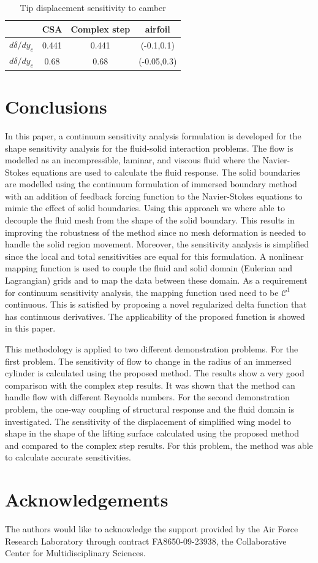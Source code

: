\documentclass[12pt]{aiaa-pretty}
\begin{document}
%
\begin{table}[H]
\centering
\begin{tabular}{c|c|c|c}
 & \multicolumn{1}{c|}{CSA} & \multicolumn{1}{c|}{Complex step} & airfoil \\ \hline
$d\delta/dy_c$ & 0.441 & 0.441 & (-0.1,0.1) \\ \hline
$d\delta/dy_c$ & 0.68 & 0.68 & (-0.05,0.3) \\
\end{tabular}
\label{table:sensitivity}
\caption{Tip displacement sensitivity to camber}
\end{table}
%
\section{Conclusions}
In this paper, a continuum sensitivity analysis formulation is developed for the shape sensitivity analysis for the fluid-solid interaction problems. The flow is modelled as an incompressible, laminar, and viscous fluid where the Navier-Stokes equations are used to calculate the fluid response. The solid boundaries are modelled using the continuum formulation of immersed boundary method with an addition of feedback forcing function to the Navier-Stokes equations to mimic the effect of solid boundaries. Using this approach we where able to decouple the fluid mesh from the shape of the solid boundary. This results in improving the robustness of the method since no mesh deformation is needed to handle the solid region movement. Moreover, the sensitivity analysis is simplified since the local and total sensitivities are equal for this formulation. A nonlinear mapping function is used to couple the fluid and solid domain (Eulerian and Lagrangian) grids and to map the data between these domain. As a requirement for continuum sensitivity analysis, the mapping function used need to be $\mathcal{C}^1$ continuous. This is satisfied by proposing a novel regularized delta function that has continuous derivatives. The applicability of the proposed function is showed in this paper.

This methodology is applied to two different demonstration problems. For the first problem. The sensitivity of flow to change in the radius of an immersed cylinder is calculated using the proposed method. The results show a very good comparison with the complex step results. It was shown that the method can handle flow with different Reynolds numbers. For the second demonstration problem, the one-way coupling of structural response and the fluid domain is investigated. The sensitivity of the displacement of simplified wing model to shape in the shape of the lifting surface calculated using the proposed method and compared to the complex step results. For this problem, the method was able to calculate accurate sensitivities.
\section*{Acknowledgements}
The authors would like to acknowledge the support provided by the Air Force Research Laboratory through contract FA8650-09-23938, the Collaborative Center for Multidisciplinary Sciences.


\end{document}
